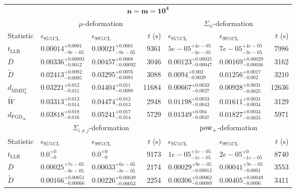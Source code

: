 \begin{tabular}{l|llr|llr}
	\toprule
	\multicolumn{7}{c}{$\mathbf{n=m=10^{4}}$} \\
	\multicolumn{1}{c}{} & \multicolumn{3}{c}{$\mu$-deformation} & \multicolumn{3}{c}{$\Sigma_{ii}$-deformation} \\
	Statistic & $\epsilon_{95\%\mathrm{CL}}$ & $\epsilon_{99\%\mathrm{CL}}$ & $t$ (s) & $\epsilon_{95\%\mathrm{CL}}$ & $\epsilon_{99\%\mathrm{CL}}$ & $t$ (s) \\
	\midrule
	$t_{\mathrm{LLR}}$ & $0.00014_{-9e-05}^{+0.0001}$ & $0.00021_{-9e-05}^{+0.0001}$ & 9361 & $5e-05_{-3e-05}^{+4e-05}$ & $7e-05_{-3e-05}^{+4e-05}$ & 7986 \\
	$\overline{D}$ & $0.00336_{-0.0012}^{+0.00093}$ & $0.00457_{-0.00092}^{+0.0008}$ & 3046 & $0.00123_{-0.00047}^{+0.00035}$ & $0.00169_{-0.00036}^{+0.00029}$ & 3162 \\
	$\widetilde{D}$ & $0.02413_{-0.0095}^{+0.0082}$ & $0.03295_{-0.0081}^{+0.0076}$ & 3088 & $0.0094_{-0.0029}^{+0.002}$ & $0.01256_{-0.002}^{+0.0017}$ & 3210 \\
	$d_{\mathrm{MMD}^{2}_{u}}$ & $0.03221_{-0.011}^{+0.012}$ & $0.04404_{-0.0098}^{+0.011}$ & 11684 & $0.00667_{-0.0027}^{+0.0033}$ & $0.00928_{-0.0025}^{+0.0031}$ & 12636 \\
	$\widetilde{W}$ & $0.03313_{-0.014}^{+0.013}$ & $0.04474_{-0.013}^{+0.012}$ & 2948 & $0.01198_{-0.0043}^{+0.0033}$ & $0.01611_{-0.0034}^{+0.0031}$ & 3129 \\
	$d_{\mathrm{FGD}_{\infty}}$ & $0.03818_{-0.016}^{+0.018}$ & $0.05241_{-0.014}^{+0.017}$ & 5729 & $0.01349_{-0.0047}^{+0.004}$ & $0.01827_{-0.0035}^{+0.0034}$ & 5971 \\
	\toprule
	\multicolumn{1}{c}{} & \multicolumn{3}{c}{$\Sigma_{i\neq j}$-deformation} & \multicolumn{3}{c}{$\rm{pow}_{+}$-deformation} \\
	Statistic & $\epsilon_{95\%\mathrm{CL}}$ & $\epsilon_{99\%\mathrm{CL}}$ & $t$ (s) & $\epsilon_{95\%\mathrm{CL}}$ & $\epsilon_{99\%\mathrm{CL}}$ & $t$ (s) \\
	\midrule
	$t_{\mathrm{LLR}}$ & $0.0_{-0}^{+0}$ & $0.0_{-0}^{+0}$ & 9173 & $1e-05_{-1e-05}^{+1e-05}$ & $2e-05_{-1e-05}^{+0}$ & 8740 \\
	$\overline{D}$ & $0.00025_{-9e-05}^{+7e-05}$ & $0.00033_{-8e-05}^{+6e-05}$ & 2174 & $0.00029_{-0.00012}^{+9e-05}$ & $0.00041_{-0.0001}^{+9e-05}$ & 3553 \\
	$\widetilde{D}$ & $0.00166_{-0.00066}^{+0.00051}$ & $0.00226_{-0.00053}^{+0.00049}$ & 2254 & $0.00306_{-0.00089}^{+0.00062}$ & $0.00405_{-0.0006}^{+0.00049}$ & 3411 \\

\end{tabular}
